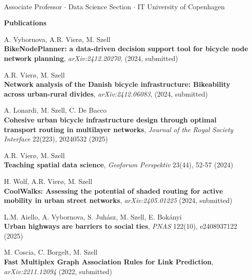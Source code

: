 \documentclass[10pt,a4paper]{article}
\def\name{Michael Szell}
\begin{document}
\begin{center}
 \\[8px]
 Associate Professor $\cdot$ Data Science Section $\cdot$ IT University of Copenhagen
\vspace{26.8pt}



\vspace{8pt}

{\large \bf Publications}
\end{center}

\begin{etaremune}
\item A. Vybornova, A.R. Vierø, M. Szell\\
\textbf{BikeNodePlanner: a data-driven decision support tool for bicycle node network planning},
\textit{arXiv:2412.20270}, (2024, submitted)
\item A.R. Vierø, M. Szell\\
\textbf{Network analysis of the Danish bicycle infrastructure: Bikeability across urban-rural divides},
\textit{arXiv:2412.06083}, (2024, submitted)
\item A. Lonardi, M. Szell, C. De Bacco\\
    \textbf{Cohesive urban bicycle infrastructure design through optimal transport routing in multilayer networks}, 
    \textit{Journal of the Royal Society Interface}  22(223), 20240532 (2025)
\item A.R. Vierø, M. Szell\\
\textbf{Teaching spatial data science}, \textit{Geoforum Perspektiv} 23(44), 52-57 (2024)
\item H. Wolf, A.R. Vierø, M. Szell\\
    \textbf{CoolWalks: Assessing the potential of shaded routing for active mobility in urban street networks}, 
    \textit{arXiv:2405.01225} (2024, submitted)
\item L.M. Aiello, A. Vybornova, S. Juhász, M. Szell, E. Bokányi\\
    \textbf{Urban highways are barriers to social ties}, 
    \textit{PNAS} 122(10), e2408937122 (2025)
\item M. Coscia, C. Borgelt, M. Szell\\
    \textbf{Fast Multiplex Graph Association Rules for Link Prediction}, 
    \textit{arXiv:2211.12094} (2022, submitted)

\end{etaremune}
\end{document}
